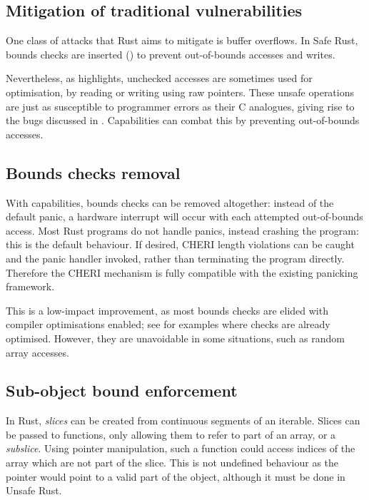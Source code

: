 \documentclass[dissertation.tex]{subfiles}
\begin{document}
\subsection{Mitigation of traditional vulnerabilities}
\label{sec:eval-rust-vulns}

One class of attacks that Rust aims to mitigate is buffer overflows.
In Safe Rust, bounds checks are inserted ()
to prevent out-of-bounds accesses and writes.

Nevertheless, as  highlights, unchecked accesses
are sometimes used for optimisation, by reading or writing using raw
pointers.
These unsafe operations are just as susceptible to programmer errors as
their C analogues, giving rise to the bugs discussed in
.
Capabilities can combat this by preventing out-of-bounds accesses.


\subsection{Bounds checks removal}
\label{sec:eval-rust-bounds}

With capabilities, bounds checks can be removed altogether: instead of
the default panic, a hardware interrupt will occur with each attempted
out-of-bounds access.
Most Rust programs do not handle panics, instead crashing the program:
this is the default behaviour.
If desired, CHERI length violations can be caught and the panic handler
invoked, rather than terminating the program directly.
Therefore the CHERI mechanism is fully compatible with the existing
panicking framework.

This is a low-impact improvement, as most bounds checks are elided with
compiler optimisations enabled; see  for examples
where checks are already optimised.
However, they are unavoidable in some situations, such as random array
accesses.


\subsection{Sub-object bound enforcement}

In Rust, \emph{slices} can be created from continuous segments of an
iterable.
Slices can be passed to functions, only allowing them to refer to part
of an array, or a \emph{subslice}.
Using pointer manipulation, such a function could access indices of the
array which are not part of the slice.
This is not undefined behaviour as the pointer would point to a valid
part of the object, although it must be done in Unsafe Rust.
\end{document}
